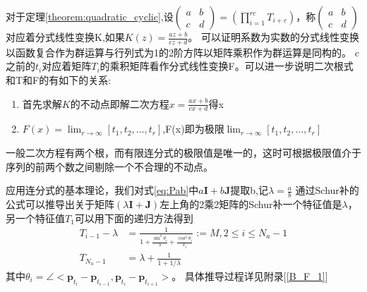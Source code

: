 \begin{remark}
对于定理\ref{theorem:quadratic_cyclic},设$\left(\begin{matrix}a&b\\c&d\end{matrix}\right)=(\prod_{i=1}^{rc} T_{i+c})$，称$\left(\begin{matrix}a&b\\c&d\end{matrix}\right)$对应着分式线性变换K,如果$K(z)=\frac{az+b}{cz+d}$。
可以证明系数为实数的分式线性变换以函数复合作为群运算与行列式为1的2阶方阵以矩阵乘积作为群运算是同构的。
c之前的$t_i$对应着矩阵$T_i$的乘积矩阵看作分式线性变换F。可以进一步说明二次根式和T和F的有如下的关系:
\begin{enumerate}
  \item 首先求解$K$的不动点即解二次方程$x=\frac{ax+b}{cx+d}$得x
  \item $F(x)=\lim_{r\to \infty}[t_1,t_2,\dots,t_r]$,F(x)即为极限$\lim_{r\to \infty}[t_1,t_2,\dots,t_r]$
\end{enumerate}
一般二次方程有两个根，而有限连分式的极限值是唯一的，这时可根据极限值介于序列的前两个数之间剔除一个不合理的不动点。
\end{remark}
应用连分式的基本理论，我们对式\ref{eq:Pab}中$a\bm{I}+b\bm{J}$提取b,记$\lambda=\frac{a}{b}$
通过Schur补的公式可以推导出关于矩阵$(\lambda\bm{I}+\bm{J})$左上角的2乘2矩阵的Schur补一个特征值是$\lambda$，另一个特征值$T_1$可以用下面的递归方法得到
\begin{equation}\label{eq:recursive_efim}
\begin{split}
T_{i-1}-\lambda & =\frac{1}{1+\frac{\sin^2\theta_i}{\lambda}+\frac{\cos^2\theta_i}{T_i}}:=M,2\leq i\leq N_a-1\\
T_{N_a-1} & = \lambda+\frac{1}{1+1/\lambda}
\end{split}
\end{equation}
其中$\theta_i=\angle <\bm{p}_{t_i}-\bm{p}_{t_{i-1}},\bm{p}_{t_i}-\bm{p}_{t_{i+1}}>$。
具体推导过程详见附录[\ref{B_F_1}]

